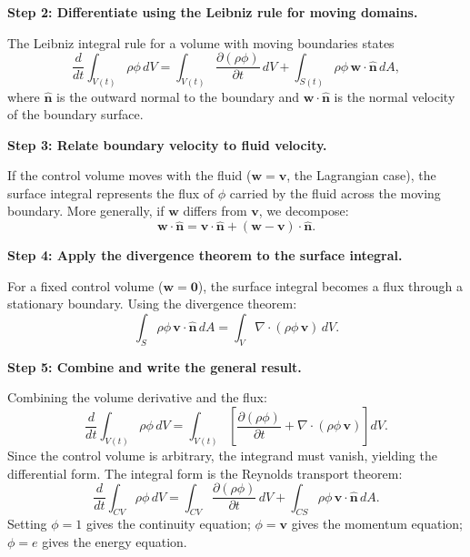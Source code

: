 \textbf{Step 2: Differentiate using the Leibniz rule for moving domains.}

The Leibniz integral rule for a volume with moving boundaries states
\begin{equation}
\frac{d}{dt}\int_{V(t)} \rho\phi\,dV = \int_{V(t)} \frac{\partial(\rho\phi)}{\partial t}\,dV + \int_{S(t)} \rho\phi\,\mathbf{w}\cdot\hat{\mathbf{n}}\,dA,
\end{equation}
where $\hat{\mathbf{n}}$ is the outward normal to the boundary and $\mathbf{w}\cdot\hat{\mathbf{n}}$ is the normal velocity of the boundary surface.

\textbf{Step 3: Relate boundary velocity to fluid velocity.}

If the control volume moves with the fluid ($\mathbf{w} = \mathbf{v}$, the Lagrangian case), the surface integral represents the flux of $\phi$ carried by the fluid across the moving boundary. More generally, if $\mathbf{w}$ differs from $\mathbf{v}$, we decompose:
\begin{equation}
\mathbf{w}\cdot\hat{\mathbf{n}} = \mathbf{v}\cdot\hat{\mathbf{n}} + (\mathbf{w} - \mathbf{v})\cdot\hat{\mathbf{n}}.
\end{equation}

\textbf{Step 4: Apply the divergence theorem to the surface integral.}

For a fixed control volume ($\mathbf{w} = \mathbf{0}$), the surface integral becomes a flux through a stationary boundary. Using the divergence theorem:
\begin{equation}
\int_{S} \rho\phi\,\mathbf{v}\cdot\hat{\mathbf{n}}\,dA = \int_{V} \nabla\cdot(\rho\phi\,\mathbf{v})\,dV.
\end{equation}

\textbf{Step 5: Combine and write the general result.}

Combining the volume derivative and the flux:
\begin{equation}
\frac{d}{dt}\int_{V(t)} \rho\phi\,dV = \int_{V(t)} \left[\frac{\partial(\rho\phi)}{\partial t} + \nabla\cdot(\rho\phi\,\mathbf{v})\right]dV.
\end{equation}
Since the control volume is arbitrary, the integrand must vanish, yielding the differential form. The integral form is the Reynolds transport theorem:
\begin{equation}
\boxed{\frac{d}{dt}\int_{CV} \rho\phi\,dV = \int_{CV} \frac{\partial(\rho\phi)}{\partial t}\,dV + \int_{CS} \rho\phi\,\mathbf{v}\cdot\hat{\mathbf{n}}\,dA.}
\end{equation}
Setting $\phi = 1$ gives the continuity equation; $\phi = \mathbf{v}$ gives the momentum equation; $\phi = e$ gives the energy equation.

